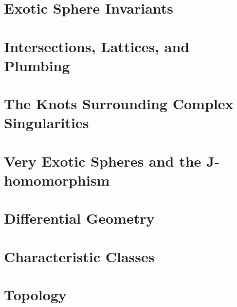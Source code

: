 \documentclass{lkx_thesis}
\begin{document}
\chapter{Exotic Sphere Invariants}\label{chap:detection}


\chapter{Intersections, Lattices, and Plumbing}\label{chap:construction_a}


\chapter{The Knots Surrounding Complex Singularities}\label{chap:construction_b}


\chapter{Very Exotic Spheres and the \texorpdfstring{$\bm{J}$}{J}-homomorphism}\label{chap:classification}


\begin{appendices}
	\chapter{Differential Geometry}\label{chap:differential_geometry}
	

	\chapter{Characteristic Classes}\label{chap:characteristic_classes}
	

	\chapter{Topology}\label{chap:topology}
	
\end{appendices}

\lkxrefs
\lkxindex
\end{document}
